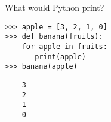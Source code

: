 \question What would Python print?
\begin{lstlisting}
>>> apple = [3, 2, 1, 0]
>>> def banana(fruits):
	for apple in fruits:
	   print(apple)
>>> banana(apple)
\end{lstlisting}
\begin{solution}[3cm]
\begin{lstlisting}
    3
    2
    1
    0
\end{lstlisting}
\end{solution}
